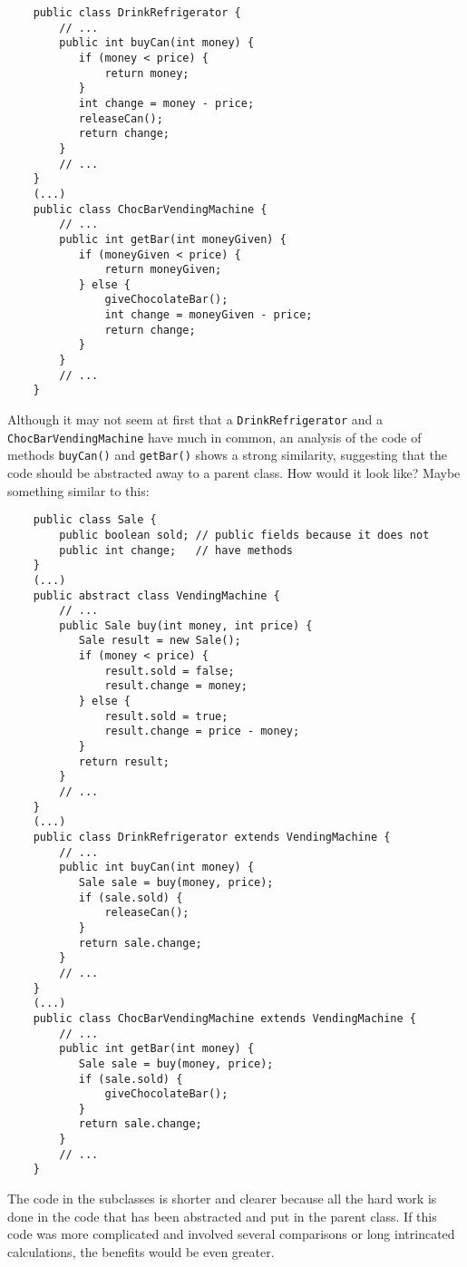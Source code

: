 \begin{verbatim}
    public class DrinkRefrigerator {
        // ...
        public int buyCan(int money) {
           if (money < price) {
               return money;
           } 
           int change = money - price;
           releaseCan();
           return change;
        }
        // ...
    }
    (...)
    public class ChocBarVendingMachine {
        // ...
        public int getBar(int moneyGiven) {
           if (moneyGiven < price) {
               return moneyGiven;
           } else {
               giveChocolateBar();
               int change = moneyGiven - price;
               return change;
           }
        }
        // ...
    }
\end{verbatim}

Although it may not seem at first that a \verb+DrinkRefrigerator+ and
a \verb+ChocBarVendingMachine+ have much in common, an analysis of the
code of methods \verb+buyCan()+ and \verb+getBar()+ shows a strong
similarity, suggesting that the code should be abstracted away to a
parent class. How would it look like? Maybe something similar to this: 

\begin{verbatim}
    public class Sale {
        public boolean sold; // public fields because it does not
        public int change;   // have methods
    }
    (...)
    public abstract class VendingMachine {
        // ...
        public Sale buy(int money, int price) {
           Sale result = new Sale();
           if (money < price) {
               result.sold = false;
               result.change = money;
           } else {
               result.sold = true;
               result.change = price - money;
           }
           return result;
        }
        // ...
    }
    (...)
    public class DrinkRefrigerator extends VendingMachine {
        // ...
        public int buyCan(int money) {
           Sale sale = buy(money, price);
           if (sale.sold) {
               releaseCan();
           } 
           return sale.change;
        }
        // ...
    }
    (...)
    public class ChocBarVendingMachine extends VendingMachine {
        // ...
        public int getBar(int money) {
           Sale sale = buy(money, price);
           if (sale.sold) {
               giveChocolateBar();
           }
           return sale.change;
        }
        // ...
    }
\end{verbatim}

The code in the subclasses is shorter and clearer because all the hard work
is done in the code that has been abstracted and put in the parent
class. If this code was more complicated and involved several
comparisons or long intrincated calculations, the benefits would be
even greater. 

